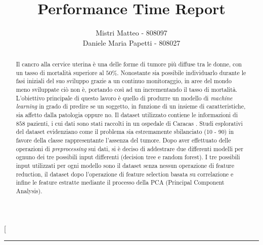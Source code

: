 \documentclass[a4paper, 12pt, conference]{ieeeconf}
\title{\LARGE \bf
Performance Time Report
}
\author{Mistri Matteo - 808097\\
	Daniele Maria Papetti - 808027
}
\begin{document}
\twocolumn[
\begin{@twocolumnfalse} 
\maketitle
\thispagestyle{empty}
\pagestyle{empty}
\rule{\textwidth}{.5pt}
\begin{abstract}

Il cancro alla cervice uterina è una delle forme di tumore più diffuse tra le donne, con un tasso di mortalità superiore al $50\%$.
Nonostante sia possibile individuarlo durante le fasi iniziali del suo sviluppo grazie a un continuo monitoraggio, in aree del mondo meno sviluppate ciò non è, portando così ad un incrementando il tasso di mortalità.
L'obiettivo principale di questo lavoro è quello di produrre un modello di \textit{machine learning} in grado di predire se un soggetto, in funzione di un insieme di caratteristiche, sia affetto dalla patologia oppure no.
Il dataset utilizzato contiene le informazioni di $858$ pazienti, i cui dati sono stati raccolti in un ospedale di Caracas \cite{ML}.
Studi esplorativi del dataset evidenziano come il problema sia estremamente sbilanciato (10 - 90) in favore della classe rappresentante l'assenza del tumore.
Dopo aver effettuato delle operazioni di \textit{preprocessing} sui dati, si è deciso di addestrare due differenti modelli per ognuno dei tre possibili input differenti (decision tree e random forest).
I tre possibili input utilizzati per ogni modello sono il dataset senza nessun operazione di feature reduction, il dataset dopo l'operazione di feature selection basata su correlazione e infine le feature estratte mediante il processo della PCA (Principal Component Analysis).

\end{abstract}
\end{@twocolumnfalse}
\end{document}
